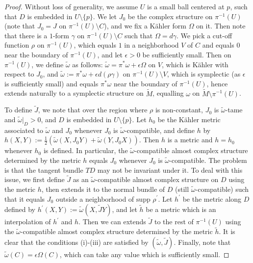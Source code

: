 \documentclass[11pt]{amsart}
\theoremstyle{plain}
\numberwithin{theorem}{section}
\theoremstyle{definition}
\begin{document}
\begin{proof}
Without loss of generality, we assume $U$ is a small ball centered at $p$, such that $D$ is embedded in $U\setminus \{p\}$. We let $J_0$ be the complex structure on $\pi^{-1}(U)$ (note that $J_0=J$ on
$\pi^{-1}(U)\setminus C$), and we fix a K\"{a}hler
form $\Omega$ on it. Then note that there is a $1$-form $\gamma$ on $\pi^{-1}(U)\setminus C$
such that $\Omega=d\gamma$. We pick a cut-off function $\rho$ on $\pi^{-1}(U)$,
which equals $1$ in a neighborhood $V$ of $C$ and equals $0$ near the boundary of $\pi^{-1}(U)$, and let $\epsilon>0$ be sufficiently small. Then on $\pi^{-1}(U)$, we define $\tilde{\omega}$ as follows:
$\tilde{\omega}=\pi^\ast\omega+\epsilon \Omega$ on $V$, which is K\"{a}hler with respect to
$J_0$, and $\tilde{\omega}:=\pi^\ast\omega+\epsilon d(\rho\gamma)$ on $\pi^{-1}(U)\setminus V$,
which is symplectic (as $\epsilon$ is sufficiently small) 
and equals $\pi^\ast\omega$ near the boundary of $\pi^{-1}(U)$, hence extends 
naturally to a symplectic structure on $\tilde{M}$, equalling $\omega$ on 
$\tilde{M}\setminus \pi^{-1}(U)$. 

To define $\tilde{J}$, we note that over the region where $\rho$ is non-constant, 
$J_0$ is $\tilde{\omega}$-tame and $\tilde{\omega}|_D>0$, and $D$ is embedded 
in $U\setminus \{p\}$. Let $h_0$ be the K\"{a}hler metric associated to $\tilde{\omega}$ and
$J_0$ whenever $J_0$ is $\tilde{\omega}$-compatible, and define $h$ by 
$h(X,Y):=\frac{1}{2}(\tilde{\omega}(X,J_0Y)+\tilde{\omega}(Y,J_0X))$. Then $h$ is a metric and 
$h=h_0$ whenever $h_0$ is defined. In particular, the $\tilde{\omega}$-compatible almost complex
structure determined by the metric $h$ equals $J_0$ whenever $J_0$ is $\tilde{\omega}$-compatible.
The problem is that the tangent bundle $TD$ may not be invariant under it. To deal with this issue,
we first define $\tilde{J}$ as an $\tilde{\omega}$-compatible almost complex structure on $D$ using the metric $h$, then extends it to the normal bundle of $D$ (still $\tilde{\omega}$-compatible) 
such that it equals $J_0$ outside a neighborhood of $\text{supp }\rho^\prime$. Let $h^\prime$ be the metric along $D$ defined by $h^\prime(X,Y):=\tilde{\omega}(X, \tilde{J}Y)$, and let $\tilde{h}$ be a metric which is an interpolation of $h^\prime$ and $h$. Then we can extends $\tilde{J}$ to the rest 
of $\pi^{-1}(U)$ using the 
$\tilde{\omega}$-compatible almost complex structure determined by the metric $\tilde{h}$. It is clear
that the conditions (i)-(iii) are satisfied by $(\tilde{\omega},\tilde{J})$. Finally, note that $\tilde{\omega}(C)=
\epsilon \Omega(C)$, which can take any value which is sufficiently small. 


\end{proof}
\end{document}
